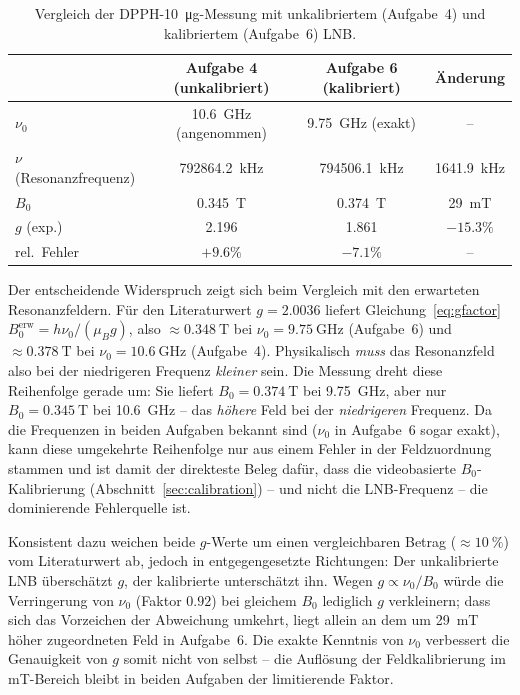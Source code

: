 \documentclass[11pt,a4paper]{article}
\begin{document}
\begin{table}[ht]
    \centering
    \caption{Vergleich der DPPH-\SI{10}{\micro\gram}-Messung mit
             unkalibriertem (Aufgabe~4) und kalibriertem (Aufgabe~6) LNB.}
    \label{tab:task6}
    \begin{tabular}{lccc}
        \toprule
         & Aufgabe 4 (unkalibriert) & Aufgabe 6 (kalibriert) & Änderung \\
        \midrule
        $\nu_0$   & \SI{10.6}{\giga\hertz} (angenommen) & \SI{9.75}{\giga\hertz} (exakt) & -- \\
        $\nu$ (Resonanzfrequenz) & \SI{792864.2}{\kilo\hertz} & \SI{794506.1}{\kilo\hertz} & \SI{+1641.9}{\kilo\hertz} \\
        $B_0$     & \SI{0.345}{\tesla} & \SI{0.374}{\tesla} & \SI{+29}{\milli\tesla} \\
        $g$ (exp.)& 2.196 & 1.861 & $-15.3\%$ \\
        rel.\ Fehler & $+9.6\%$ & $-7.1\%$ & -- \\
        \bottomrule
    \end{tabular}
\end{table}

Der entscheidende Widerspruch zeigt sich beim Vergleich mit den erwarteten
Resonanzfeldern. Für den Literaturwert $g = 2.0036$ liefert
Gleichung~\eqref{eq:gfactor} $B_0^{\text{erw}} = h\nu_0/(\mu_B g)$, also
$\approx \SI{0.348}{\tesla}$ bei $\nu_0 = \SI{9.75}{\giga\hertz}$ (Aufgabe~6)
und $\approx \SI{0.378}{\tesla}$ bei $\nu_0 = \SI{10.6}{\giga\hertz}$
(Aufgabe~4). Physikalisch \emph{muss} das Resonanzfeld also bei der
niedrigeren Frequenz \emph{kleiner} sein. Die Messung dreht diese Reihenfolge
gerade um: Sie liefert $B_0 = \SI{0.374}{\tesla}$ bei \SI{9.75}{\giga\hertz},
aber nur $B_0 = \SI{0.345}{\tesla}$ bei \SI{10.6}{\giga\hertz} -- das
\emph{höhere} Feld bei der \emph{niedrigeren} Frequenz. Da die Frequenzen in
beiden Aufgaben bekannt sind ($\nu_0$ in Aufgabe~6 sogar exakt), kann diese
umgekehrte Reihenfolge nur aus einem Fehler in der Feldzuordnung stammen und
ist damit der direkteste Beleg dafür, dass die videobasierte
$B_0$-Kalibrierung (Abschnitt~\ref{sec:calibration}) -- und nicht die
LNB-Frequenz -- die dominierende Fehlerquelle ist.

Konsistent dazu weichen beide $g$-Werte um einen vergleichbaren Betrag
($\approx \SI{10}{\percent}$) vom Literaturwert ab, jedoch in
entgegengesetzte Richtungen: Der unkalibrierte LNB überschätzt $g$, der
kalibrierte unterschätzt ihn. Wegen $g \propto \nu_0/B_0$ würde die
Verringerung von $\nu_0$ (Faktor $0.92$) bei gleichem $B_0$ lediglich $g$
verkleinern; dass sich das Vorzeichen der Abweichung umkehrt, liegt allein an
dem um \SI{29}{\milli\tesla} höher zugeordneten Feld in Aufgabe~6. Die exakte
Kenntnis von $\nu_0$ verbessert die Genauigkeit von $g$ somit nicht von
selbst -- die Auflösung der Feldkalibrierung im \si{\milli\tesla}-Bereich
bleibt in beiden Aufgaben der limitierende Faktor.
\end{document}
